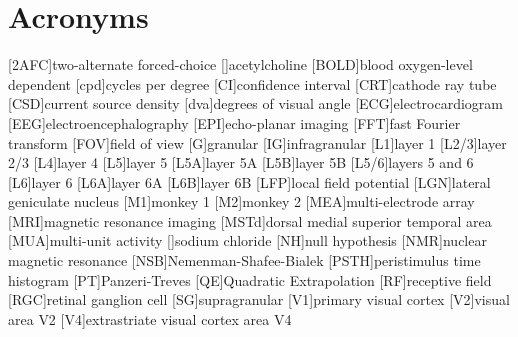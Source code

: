    \chapter*{Acronyms}
    \begin{acronym}[BOLD]
        [2AFC]{two-alternate forced-choice}
        []{acetylcholine}
        [BOLD]{blood oxygen-level dependent}
        [cpd]{cycles per degree}
        [CI]{confidence interval}
        [CRT]{cathode ray tube}
        [CSD]{current source density}
        [dva]{degrees of visual angle}
        [ECG]{electrocardiogram}
        [EEG]{electroencephalography}
        [EPI]{echo-planar imaging}
        [FFT]{fast Fourier transform}
        [FOV]{field of view}
        [G]{granular}
        [IG]{infragranular}
        [L1]{layer 1}
        [L2/3]{layer 2/3}
        [L4]{layer 4}
        [L5]{layer 5}
        [L5A]{layer 5A}
        [L5B]{layer 5B}
        [L5/6]{layers 5 and 6}
        [L6]{layer 6}
        [L6A]{layer 6A}
        [L6B]{layer 6B}
        [LFP]{local field potential}
        [LGN]{lateral geniculate nucleus}
        [M1]{monkey 1}
        [M2]{monkey 2}
        [MEA]{multi-electrode array}
        [MRI]{magnetic resonance imaging}
        [MSTd]{dorsal medial superior temporal area}
        [MUA]{multi-unit activity}
        []{sodium chloride}
        [NH]{null hypothesis}
        [NMR]{nuclear magnetic resonance}
        [NSB]{{N}emenman-{S}hafee-{B}ialek}
        [PSTH]{peristimulus time histogram}
        [PT]{{P}anzeri-{T}reves}
        [QE]{Quadratic Extrapolation}
        [RF]{receptive field}
        [RGC]{retinal ganglion cell}
        [SG]{supragranular}
        [V1]{primary visual cortex}
        [V2]{visual area \acs{V2}}
        [V4]{extrastriate visual cortex area \acs{V4}}
    \end{acronym}                     
\endgroup

\cleardoublepage
